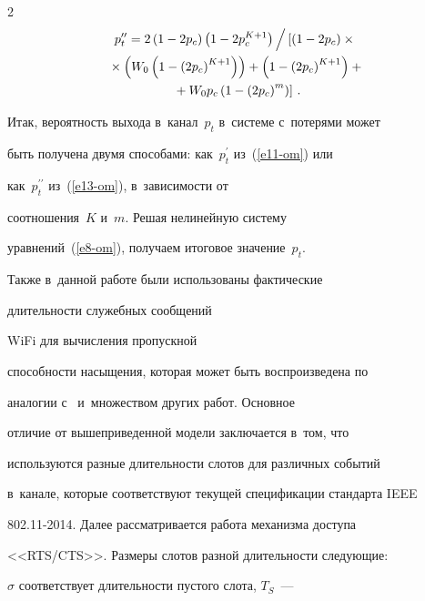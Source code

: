 \begin{multicols}{2}
\begin{multline}
    p^{\prime\prime}_t =   2\left(1-2p_c\right)\left(1-2p_c^{K+1}\right)\Big / 


    \left[ \vphantom{\left(2p_c\right)^m}


    (1-2p_c)\times{}\right.\\


   {}\times 


\left(W_0\left(1-\left(2p_c\right)^{K+1}\right)\right)+


\left(1-\left(2p_c\right)^{K+1}\right) +{}\\


\left. {}+W_0 p_c\left(1-\left(2p_c\right)^m\right)\right]\,.


    \label{e13-om}


    \end{multline}


    


    Итак, вероятность выхода в~канал~$p_t$ в~системе с~потерями может 


быть получена двумя способами: как~$p^\prime_t$ из~(\ref{e11-om}) или 


как~$p_t^{\prime\prime}$ из~(\ref{e13-om}), в~зависимости от 


соотношения~$K$ и~$m$. Решая нелинейную систему 


уравнений~(\ref{e8-om}), получаем итоговое значение~$p_t$.


    


    Также в~данной работе были использованы фактические 


длительности служебных сообщений\linebreak


 WiFi для вычисления пропускной 


способности насыщения, которая может быть воспроизведена по 


аналогии с~\cite{9-om, 8-om, 11-om} и~множеством других работ. Основное 


отличие от вышеприведенной модели заключается в~том, что 


используются разные длительности слотов для различных событий 


в~канале, которые соответствуют текущей спецификации стандарта IEEE 


802.11-2014. Далее рассматривается работа механизма доступа 


<<RTS/CTS>>. Размеры слотов разной длительности следующие: 


$\sigma$ соответствует длительности пустого слота, $T_S$~--- 



\end{multicols}
